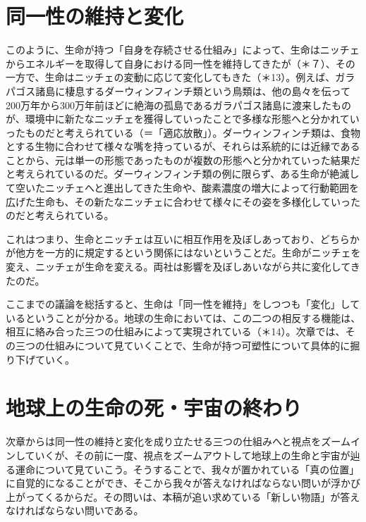 \documentclass[
]{ltjsarticle}
\begin{document}
\section{同一性の維持と変化}\label{ux540cux4e00ux6027ux306eux7dadux6301ux3068ux5909ux5316}

このように、生命が持つ「自身を存続させる仕組み」によって、生命はニッチェからエネルギーを取得して自身における同一性を維持してきたが（＊７）、その一方で、生命はニッチェの変動に応じて変化してもきた（＊13）。例えば、ガラパゴス諸島に棲息するダーウィンフィンチ類という鳥類は、他の島々を伝って200万年から300万年前ほどに絶海の孤島であるガラパゴス諸島に渡来したものが、環境中に新たなニッチェを獲得していったことで多様な形態へと分かれていったものだと考えられている（＝「適応放散」）。ダーウィンフィンチ類は、食物とする生物に合わせて様々な嘴を持っているが、それらは系統的には近縁であることから、元は単一の形態であったものが複数の形態へと分かれていった結果だと考えられているのだ。ダーウィンフィンチ類の例に限らず、ある生命が絶滅して空いたニッチェへと進出してきた生命や、酸素濃度の増大によって行動範囲を広げた生命も、その新たなニッチェに合わせて様々にその姿を多様化していったのだと考えられている。

これはつまり、生命とニッチェは互いに相互作用を及ぼしあっており、どちらかが他方を一方的に規定するという関係にはないということだ。生命がニッチェを変え、ニッチェが生命を変える。両社は影響を及ぼしあいながら共に変化してきたのだ。

ここまでの議論を総括すると、生命は「同一性を維持」をしつつも「変化」しているということが分かる。地球の生命においては、この二つの相反する機能は、相互に絡み合った三つの仕組みによって実現されている（＊14）。次章では、その三つの仕組みについて見ていくことで、生命が持つ可塑性について具体的に掘り下げていく。

\section{地球上の生命の死・宇宙の終わり}\label{ux5730ux7403ux4e0aux306eux751fux547dux306eux6b7bux5b87ux5b99ux306eux7d42ux308fux308a}

次章からは同一性の維持と変化を成り立たせる三つの仕組みへと視点をズームインしていくが、その前に一度、視点をズームアウトして地球上の生命と宇宙が辿る運命について見ていこう。そうすることで、我々が置かれている「真の位置」に自覚的になることができ、そこから我々が答えなければならない問いが浮かび上がってくるからだ。その問いは、本稿が追い求めている「新しい物語」が答えなければならない問いである。
\end{document}
